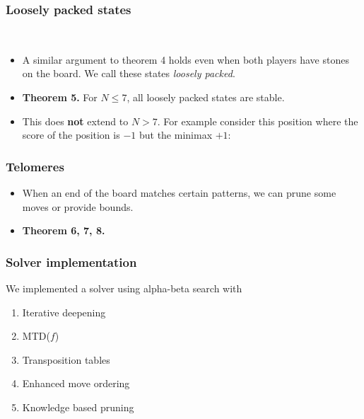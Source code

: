 \documentclass{beamer}
\begin{document}
    \begin{frame}
        \frametitle{Loosely packed states}
        \begin{center}
            \cleargoban
            \showgoban[b2,h2]\\\medskip
            \cleargoban
            \showgoban[b2,g2]
        \end{center}
        \begin{itemize}
            \item A similar argument to theorem 4 holds even when both players have stones
                on the board. We call these states \textit{loosely packed}.
            \item \textbf{Theorem 5.} For $N\leq7$, all loosely packed states are stable.
            \pause
            \item This does \textbf{not} extend to $N>7$. For example consider this position
                where the score of the position is $-1$ but the minimax $+1$:
                \begin{center}
                    \cleargoban
                    \showgoban[b2,j2]
                \end{center}
        \end{itemize}
    \end{frame}

    \begin{frame}
        \frametitle{Telomeres}
        \begin{itemize}
            \item When an end of the board matches certain patterns, we can prune some moves or provide bounds.
            \item \textbf{Theorem 6, 7, 8.}
        \end{itemize}
    \end{frame}

    \begin{frame}
        \frametitle{Solver implementation}
        We implemented a solver using alpha-beta search with
        \begin{enumerate}
            \item Iterative deepening
            \item MTD($f$)
            \item Transposition tables
            \item Enhanced move ordering
            \item Knowledge based pruning
        \end{enumerate}
    \end{frame}
\end{document}
